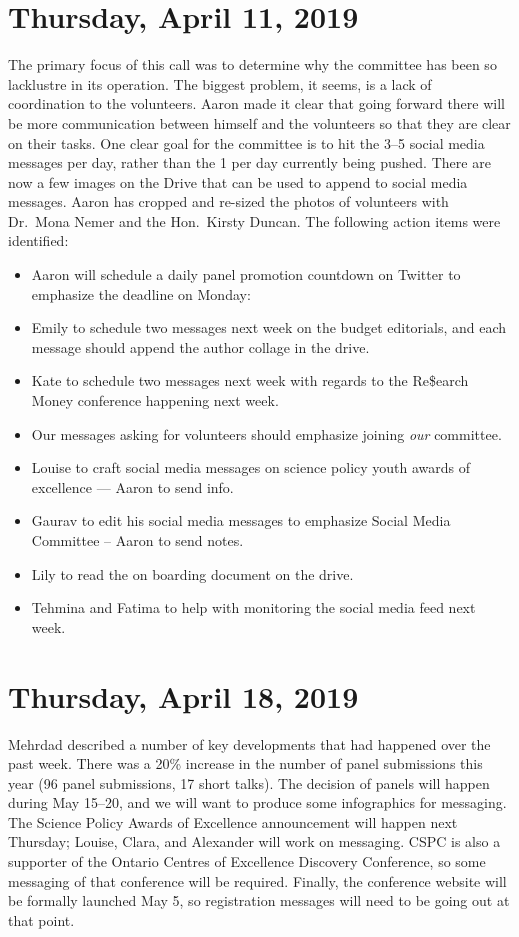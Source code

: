 \documentclass[12pt]{amsart}
\begin{document}
\section{Thursday, April 11, 2019}\label{mgt04}%
The primary focus of this call was to determine why the committee has been so lacklustre in its operation.
The biggest problem, it seems, is a lack of coordination to the volunteers.
Aaron made it clear that going forward there will be more communication between himself and the volunteers so that they are clear on their tasks.
One clear goal for the committee is to hit the 3--5 social media messages per day, rather than the 1 per day currently being pushed.
There are now a few images on the Drive that can be used to append to social media messages.
Aaron has cropped and re-sized the photos of volunteers with Dr.~Mona Nemer and the Hon.~Kirsty Duncan.
The following action items were identified:
\begin{itemize}
\item Aaron will schedule a daily panel promotion countdown on Twitter to emphasize the deadline on Monday: 
\item Emily to schedule two messages next week on the budget editorials, and each message should append the author collage in the drive.
\item Kate to schedule two messages next week with regards to the Re\$earch Money conference happening next week.
\item Our messages asking for volunteers should emphasize joining \emph{our} committee.
\item Louise to craft social media messages on science policy youth awards of excellence --- Aaron to send info.
\item Gaurav to edit his social media messages to emphasize Social Media Committee -- Aaron to send notes.
\item Lily to read the on boarding document on the drive.
\item Tehmina and Fatima to help with monitoring the social media feed next week.
\end{itemize}
\section{Thursday, April 18, 2019}\label{mgt05}%
Mehrdad described a number of key developments that had happened over the past week.
There was a 20\% increase in the number of panel submissions this year (96 panel submissions, 17 short talks).
The decision of panels will happen during May 15--20, and we will want to produce some infographics for messaging.
The Science Policy Awards of Excellence announcement will happen next Thursday; Louise, Clara, and Alexander will work on messaging.
CSPC is also a supporter of the Ontario Centres of Excellence Discovery Conference, so some messaging of that conference will be required.
Finally, the conference website will be formally launched May 5, so registration messages will need to be going out at that point.
\end{document}
